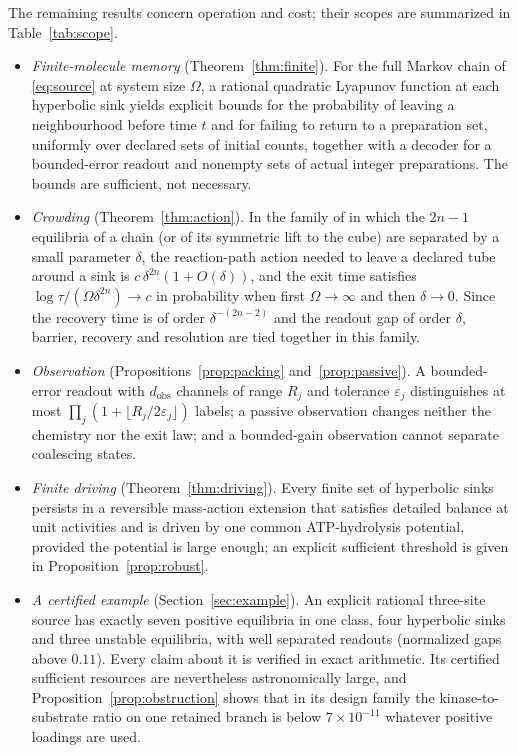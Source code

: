 \documentclass[11pt]{article}
\theoremstyle{plain}
\theoremstyle{definition}
\theoremstyle{remark}
\numberwithin{equation}{section}
\begin{document}
The remaining results concern operation and cost; their scopes are summarized in
Table~\ref{tab:scope}.
\begin{itemize}
\item \emph{Finite-molecule memory} (Theorem~\ref{thm:finite}). For the full Markov chain of
\eqref{eq:source} at system size \(\Omega\), a rational quadratic Lyapunov function at each
hyperbolic sink yields explicit bounds for the probability of leaving a neighbourhood before
time \(t\) and for failing to return to a preparation set, uniformly over declared sets of
initial counts, together with a decoder for a bounded-error readout and nonempty sets of
actual integer preparations. The bounds are sufficient, not necessary.
\item \emph{Crowding} (Theorem~\ref{thm:action}). In the family of \cite{Companion} in which
the \(2n-1\) equilibria of a chain (or of its symmetric lift to the cube) are separated by a
small parameter \(\delta\), the reaction-path action needed to leave a declared tube around a
sink is \(c\,\delta^{2n}(1+O(\delta))\), and the exit time satisfies
\(\log\tau/(\Omega\delta^{2n})\to c\) in probability when first \(\Omega\to\infty\) and then
\(\delta\to0\). Since the recovery time is of order \(\delta^{-(2n-2)}\) and the readout gap of
order \(\delta\), barrier, recovery and resolution are tied together in this family.
\item \emph{Observation} (Propositions~\ref{prop:packing} and~\ref{prop:passive}). A bounded-error readout with
\(d_{\mathrm{obs}}\) channels of range \(R_j\) and tolerance \(\varepsilon_j\) distinguishes at
most \(\prod_j(1+\lfloor R_j/2\varepsilon_j\rfloor)\) labels; a passive observation changes
neither the chemistry nor the exit law; and a bounded-gain observation cannot separate
coalescing states.
\item \emph{Finite driving} (Theorem~\ref{thm:driving}). Every finite set of hyperbolic sinks
persists in a reversible mass-action extension that satisfies detailed balance at unit
activities and is driven by one common ATP-hydrolysis potential, provided the potential is
large enough; an explicit sufficient threshold is given in Proposition~\ref{prop:robust}.
\item \emph{A certified example} (Section~\ref{sec:example}). An explicit rational three-site
source has exactly seven positive equilibria in one class, four hyperbolic sinks and three
unstable equilibria, with well separated readouts (normalized gaps above \(0.11\)). Every
claim about it is verified in exact arithmetic. Its certified sufficient resources are
nevertheless astronomically large, and Proposition~\ref{prop:obstruction} shows that in its
design family the kinase-to-substrate ratio on one retained branch is below \(7\times10^{-11}\)
whatever positive loadings are used.
\end{itemize}
\end{document}
